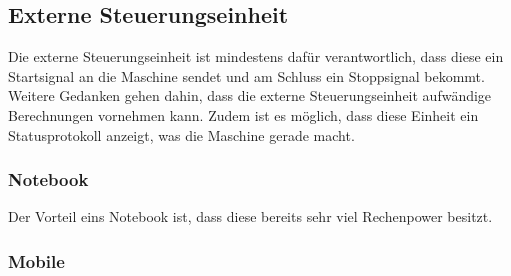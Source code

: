 \subsection{Externe Steuerungseinheit}
Die externe Steuerungseinheit ist mindestens dafür verantwortlich, dass diese ein Startsignal an die Maschine sendet und am Schluss ein Stoppsignal bekommt. Weitere Gedanken gehen dahin, dass die externe Steuerungseinheit aufwändige Berechnungen vornehmen kann. Zudem ist es möglich, dass diese Einheit ein Statusprotokoll anzeigt, was die Maschine gerade macht.

\subsubsection{Notebook}
Der Vorteil eins Notebook ist, dass diese bereits sehr viel Rechenpower besitzt. 

\subsubsection{Mobile}
